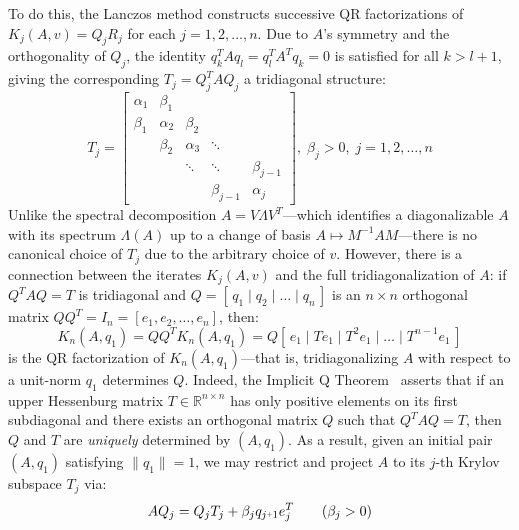 \documentclass[10pt]{article}
\numberwithin{equation}{section}
\newcommand{\+}{%
	\raisebox{0.18ex}{\scaleobj{0.55}{+}}
}
\theoremstyle{definition}
\theoremstyle{definition}
\begin{document}
To do this, the Lanczos method constructs successive QR factorizations of $K_j(A,v) = Q_j R_j$ for each $j = 1, 2, \dots, n$.
Due to $A$'s symmetry and the orthogonality of $Q_j$, the identity $q_k^T A q_l = q_l^T A^T q_k = 0$ is satisfied for all $k > l + 1$, giving the corresponding $T_j = Q_j^T A Q_j$ a tridiagonal structure:
\begin{equation}
	T_j = \begin{bmatrix} 
	\alpha_1 & \beta_1 & & & \\
	\beta_1 & \alpha_2 & \beta_2 & & \\
	 & \beta_2 & \alpha_3 & \ddots & \\
	& & \ddots & \ddots & \beta_{j-1} \\
	& & & \beta_{j-1} & \alpha_{j} 
	\end{bmatrix}, \; \beta_j > 0, \; j = 1, 2, \dots, n
\end{equation}
Unlike the spectral decomposition $A = V \Lambda V^T$---which identifies a diagonalizable $A$ with its spectrum $\Lambda(A)$ up to a change of basis $A \mapsto M^{-1} A M$---there is no canonical choice of $T_j$ due to the arbitrary choice of $v$. 
However, there is a connection between the iterates $K_j(A,v)$ and the full tridiagonalization of $A$: if $Q^T A Q = T$ is tridiagonal and $Q= [\, q_1 \mid q_2 \mid \dots \mid q_n \,]$ is an $n \times n$ orthogonal matrix $Q Q^T = I_n = [e_1, e_2, \dots, e_n]$, then:
\begin{equation}
	K_n(A, q_1) = Q Q^T K_n(A, q_1) = Q[ \, e_1 \mid T e_1 \mid T^2 e_1 \mid \dots \mid T^{n-1} e_1 \, ]
\end{equation}
is the QR factorization of $K_n(A, q_1)$---that is, tridiagonalizing $A$ with respect to a unit-norm $q_1$ determines $Q$. 
Indeed, the Implicit Q Theorem~\cite{golub2013matrix} asserts that if an upper Hessenburg matrix $T \in \mathbb{R}^{n \times n}$ has only positive elements on its first subdiagonal and there exists an orthogonal matrix $Q$ such that $Q^T A Q = T$, then $Q$ and $T$ are \emph{uniquely} determined by $(A, q_1)$. 
As a result, given an initial pair $(A, q_1)$ satisfying $\lVert q_1 \rVert = 1$, we may restrict and project $A$ to its $j$-th Krylov subspace $T_j$ via: 
\begin{equation}\label{eq:krylov_proj}
	A Q_j = Q_j T_j + \beta_j q_{j\+1} e_{j}^T \quad\quad (\beta_j > 0)
\end{equation}
\end{document}
